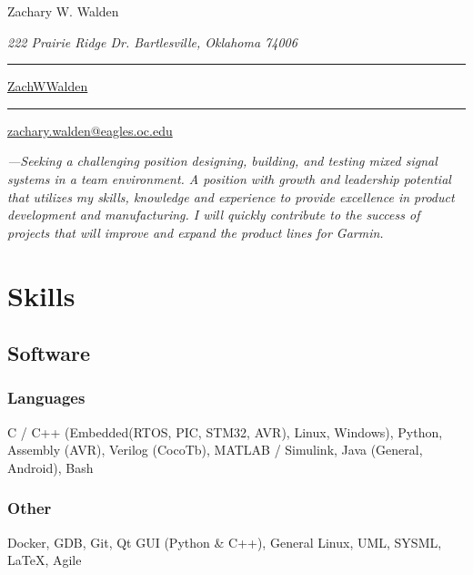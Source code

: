 \documentclass{article}
\newcommand\mybar{\kern1pt\rule[-\dp\strutbox]{.8pt}{\baselineskip}\kern1pt}
\begin{document}
\begin{center}
	\begin{Huge}
		Zachary W. Walden\\
	\end{Huge}
	\begin{large}
		\textsl{222 Prairie Ridge Dr. Bartlesville, Oklahoma 74006}\\
	\end{large}
	\begin{normalsize}
		 \mybar { } \faGithub \href{https://github.com/ZachWWalden}{ ZachWWalden}
		\mybar { }\faEnvelope\href{mailto::zachary.walden@eagles.oc.edu}{ zachary.walden@eagles.oc.edu}
	\end{normalsize}
\end{center}
\begin{spacing}{.5}

\begin{adjustwidth}{30pt}{30pt}
	\textit{\large{---Seeking a challenging position designing, building, and testing mixed signal systems in a team environment. A position with growth and leadership potential that utilizes my skills, knowledge and experience to provide excellence in product development and manufacturing.
	I will quickly contribute to the success of projects that will improve and expand the product lines for Garmin.}}
\end{adjustwidth}

\section{Skills}
	\subsection{Software}
		\subsubsection{Languages} \large{ C / C++} \small{(Embedded(RTOS, PIC, STM32, AVR), Linux, Windows),}\large{ Python, Assembly} \small{(AVR),} \large{ Verilog} \small{(CocoTb),} \hspace*{1cm}\large{ MATLAB / Simulink, Java} \small{(General, Android),} \large{ Bash}
		\subsubsection{Other} \large{ Docker, GDB, Git, Qt GUI} \small{(Python \& C++),} \large{ General Linux, UML, SYSML, \LaTeX, Agile}

\end{spacing}
\end{document}

